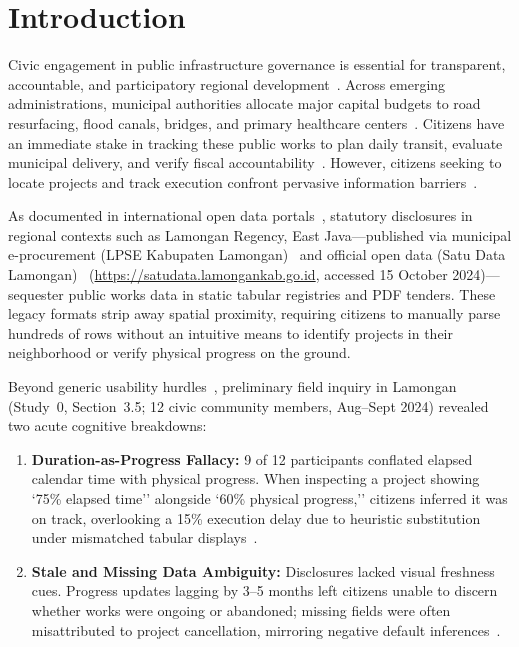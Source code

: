 \documentclass[runningheads]{llncs}
\begin{document}
\section{Introduction}
Civic engagement in public infrastructure governance is essential for transparent, accountable, and participatory regional development~\cite{ansari2022enhancing,chokki2022engaging}. Across emerging administrations, municipal authorities allocate major capital budgets to road resurfacing, flood canals, bridges, and primary healthcare centers~\cite{saelawong2024transparency}. Citizens have an immediate stake in tracking these public works to plan daily transit, evaluate municipal delivery, and verify fiscal accountability~\cite{nikiforova2021open,zhao2023digital}. However, citizens seeking to locate projects and track execution confront pervasive information barriers~\cite{ansari2022enhancing,nikiforova2021open}.

As documented in international open data portals~\cite{matheus2021design,zhao2023digital}, statutory disclosures in regional contexts such as Lamongan Regency, East Java---published via municipal e-procurement (LPSE Kabupaten Lamongan)~\cite{jaelani2024pelaksanaan} and official open data (Satu Data Lamongan)~\cite{satudatalamongan2024} (\url{https://satudata.lamongankab.go.id}, accessed 15 October 2024)---sequester public works data in static tabular registries and PDF tenders. These legacy formats strip away spatial proximity, requiring citizens to manually parse hundreds of rows without an intuitive means to identify projects in their neighborhood or verify physical progress on the ground.

Beyond generic usability hurdles~\cite{nikiforova2021open,zhao2023digital}, preliminary field inquiry in Lamongan (Study~0, Section~3.5; 12 civic community members, Aug--Sept 2024) revealed two acute cognitive breakdowns:
\begin{enumerate}\setlength{\itemsep}{0.8pt}\setlength{\parskip}{0pt}
    \item \textbf{Duration-as-Progress Fallacy:} 9 of 12 participants conflated elapsed calendar time with physical progress. When inspecting a project showing `75\% elapsed time'' alongside `60\% physical progress,'' citizens inferred it was on track, overlooking a 15\% execution delay due to heuristic substitution under mismatched tabular displays~\cite{bacic2022advancing}.
    \item \textbf{Stale and Missing Data Ambiguity:} Disclosures lacked visual freshness cues. Progress updates lagging by 3--5 months left citizens unable to discern whether works were ongoing or abandoned; missing fields were often misattributed to project cancellation, mirroring negative default inferences~\cite{fernstad2022explore}.
\end{enumerate}
\end{document}
